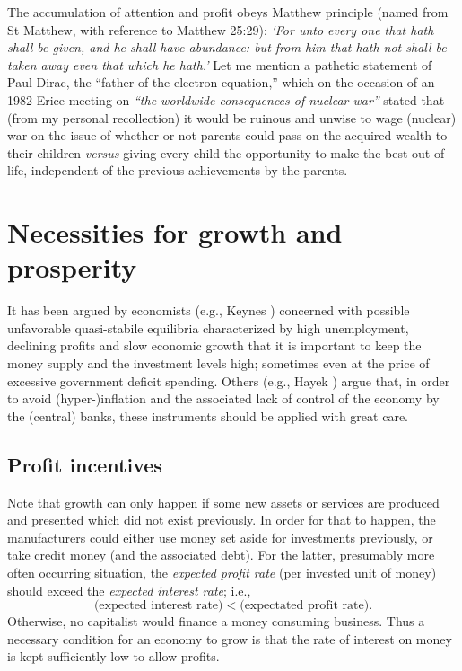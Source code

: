 \documentclass[aps,rmp,preprint,amsfonts,showpacs,showkeys]{revtex4}
\begin{document}
The accumulation of attention and profit obeys Matthew principle (named from St Matthew,
with reference to Matthew 25:29): {\em `For unto every one that hath shall be given, and he shall have abundance:
but from him that hath not shall be taken away even that which he hath.'}
Let me mention a pathetic statement of Paul Dirac, the ``father of the electron equation,'' which on the occasion of an 1982 Erice meeting
on {\em ``the worldwide consequences of nuclear war''} stated that (from my personal recollection) it would be ruinous and unwise
to wage (nuclear) war on the issue of whether or not parents could pass on the acquired wealth to their children {\em versus} giving every child the opportunity
to make the best out of life, independent of the previous achievements by the parents.



\section{Necessities for growth and prosperity}

It has been argued by economists (e.g., Keynes \cite{keynes-GTEIM}) concerned with possible unfavorable quasi-stabile equilibria
characterized by high unemployment, declining profits and slow economic growth
that it is important to keep the money supply and the investment levels  high; sometimes even at the price of
excessive government deficit spending.
Others (e.g., Hayek \cite{Hayek-45}) argue that, in order to avoid (hyper-)inflation and the associated lack of control of the economy by the (central) banks,
these instruments should be applied with great care.

\subsection{Profit incentives}
Note that growth can only happen if some new assets or services are produced and presented which did not exist previously.
In order for that to happen, the manufacturers could either use money set aside for investments previously, or take credit money (and the associated debt).
For the latter, presumably more often occurring situation, the {\em expected profit rate} (per invested unit of money) should exceed the
{\em expected interest rate}; i.e.,
$$
\mbox{(expected interest rate)} < \mbox{(expectated profit rate)} .
$$
Otherwise, no capitalist would finance a money consuming business.
Thus a necessary condition for an economy to grow  is that
the rate of interest on money is kept sufficiently low to allow profits.
\end{document}
